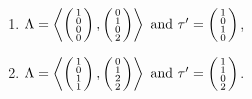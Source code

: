 \begin{prop}
\begin{enumerate}
\item
$\Lambda=\plan{1\\0\\0\\0}{0\\1\\0\\2} \text{ and } \tau' = \vect{1\\0\\1\\0}$,

\item
$\Lambda=\plan{1\\0\\1\\1}{0\\1\\2\\2} \text{ and } \tau' = \vect{1\\1\\0\\2}$.
\end{enumerate}
\end{prop}

